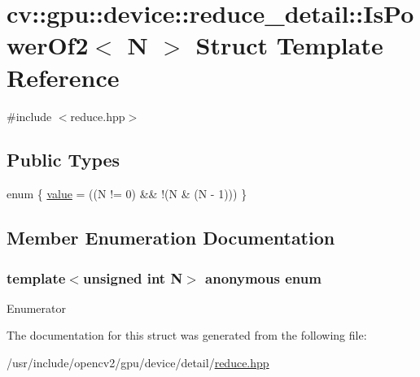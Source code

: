 \hypertarget{structcv_1_1gpu_1_1device_1_1reduce__detail_1_1IsPowerOf2}{\section{cv\-:\-:gpu\-:\-:device\-:\-:reduce\-\_\-detail\-:\-:Is\-Power\-Of2$<$ N $>$ Struct Template Reference}
\label{structcv_1_1gpu_1_1device_1_1reduce__detail_1_1IsPowerOf2}
}


{\ttfamily \#include $<$reduce.\-hpp$>$}

\subsection*{Public Types}
\begin{DoxyCompactItemize}
\item 
enum \{ \hyperlink{structcv_1_1gpu_1_1device_1_1reduce__detail_1_1IsPowerOf2_a2c6d88cbc9f041c10a2d3849c31290afa0aa87280cbeff9ad67c4e60605c36d46}{value} = ((N != 0) \&\& !(N \& (N -\/ 1)))
 \}
\end{DoxyCompactItemize}


\subsection{Member Enumeration Documentation}
\hypertarget{structcv_1_1gpu_1_1device_1_1reduce__detail_1_1IsPowerOf2_a2c6d88cbc9f041c10a2d3849c31290af}{\subsubsection[{anonymous enum}]{\setlength{\rightskip}{0pt plus 5cm}template$<$unsigned int N$>$ anonymous enum}}\label{structcv_1_1gpu_1_1device_1_1reduce__detail_1_1IsPowerOf2_a2c6d88cbc9f041c10a2d3849c31290af}
\begin{Desc}
\item[Enumerator]\par
\begin{description}
\item[{\em 
\hypertarget{structcv_1_1gpu_1_1device_1_1reduce__detail_1_1IsPowerOf2_a2c6d88cbc9f041c10a2d3849c31290afa0aa87280cbeff9ad67c4e60605c36d46}{value}\label{structcv_1_1gpu_1_1device_1_1reduce__detail_1_1IsPowerOf2_a2c6d88cbc9f041c10a2d3849c31290afa0aa87280cbeff9ad67c4e60605c36d46}
}]\end{description}
\end{Desc}


The documentation for this struct was generated from the following file\-:\begin{DoxyCompactItemize}
\item 
/usr/include/opencv2/gpu/device/detail/\hyperlink{detail_2reduce_8hpp}{reduce.\-hpp}\end{DoxyCompactItemize}
